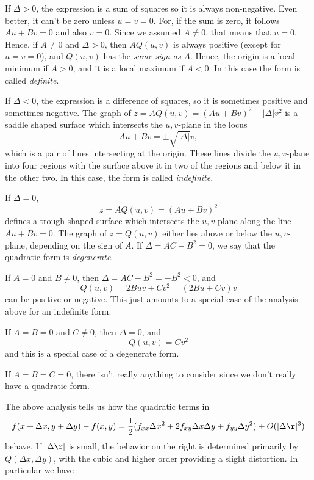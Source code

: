 If $\Delta > 0$, the expression is
a sum of squares so it is always non-negative.  Even better,
it can't be zero unless $u = v = 0$.  For, if the sum is
zero, it follows $Au + Bv = 0$ and also $v = 0$.  Since
we assumed $A \not=0$, that means that $u = 0$.  Hence,
if $A\not= 0$ and $\Delta > 0$, then $AQ(u,v)$
is always positive (except for $u=v=0$), and $Q(u,v)$
 has the {\it same sign as\/} $A$.  Hence, the origin
is a local minimum if $A > 0$, and it is a local maximum
if $A < 0$.  In this case the form is called {\it definite}.
%
%

If $\Delta < 0$, the expression is a difference of squares,
so it is sometimes positive and sometimes negative.   The
graph of $z = AQ(u,v) = (Au + Bv)^2 - |\Delta|v^2$ is a saddle shaped
surface which intersects  the $u,v$-plane in the locus
$$
Au + Bv = \pm \sqrt{|\Delta|}v,
$$
which is a pair of lines intersecting at the origin.
These lines divide the $u,v$-plane into four regions with
the surface above it in two of the regions and below it
in the other two.  In this case, the form is called
{\it indefinite}.
%
\medskip
\centerline{}
\medskip

If $\Delta = 0$, 
$$
 z = AQ(u,v) =  (Au + Bv)^2
$$
defines a trough shaped surface which intersects the $u,v$-plane
along the line $Au + Bv = 0$.   The graph of $z = Q(u,v)$
either lies above or  below the $u,v$-plane,
depending on the sign of $A$.   If $\Delta = AC - B^2 = 0$,
we say that the quadratic form is {\it degenerate}.
%

If $A = 0$ and $B\not= 0$, then $\Delta = AC - B^2 = -B^2 < 0$, and
$$
Q(u,v) = 2Buv + Cv^2 = (2Bu + Cv)v
$$
can be positive or negative.  This just amounts to a special
case of the analysis above for an indefinite form.  

If $A = B = 0$ and $C\not = 0$, then $\Delta = 0$, and
$$
Q(u,v) = Cv^2
$$
and this is a special case of a degenerate form.   

If $A = B = C = 0$, there isn't really anything to consider
since we don't really have a quadratic form.


The above analysis tells us how the quadratic terms in
$$
f(x+\Delta x, y+\Delta y) - f(x,y)
 = \frac 12(f_{xx}\Delta x^2 + 2f_{xy}\Delta x \Delta y
+ f_{yy}\Delta y^2) + O(|\Delta\r|^3)
$$
behave.   
If $|\Delta\r|$ is small, the behavior on the
right is determined primarily by
 $Q(\Delta x, \Delta y)$, with the cubic and higher order
providing a slight distortion.   In particular we have

